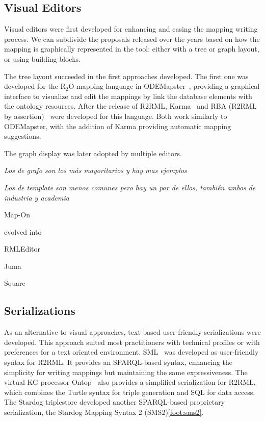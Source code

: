 \subsection{Visual Editors}
\label{sec:chp2_visual-editors}

Visual editors were first developed for enhancing and easing the mapping writing process. We can subdivide the proposals released over the years based on how the mapping is graphically represented in the tool: either with a tree or graph layout, or using building blocks.

The tree layout succeeded in the first approaches developed. 
The first one was developed for the R$_2$O mapping language in ODEMapster~\parencite{barrasa2006odemapster}, providing a graphical interface to visualize and edit the mappings by link the database elements with the ontology resources. 
After the release of R2RML, Karma~\parencite{gupta2012karma} and RBA (R2RML by assertion)~\parencite{neto2013rba} were developed for this language. Both work similarly to ODEMapster, with the addition of Karma providing automatic mapping suggestions. 

The graph display was later adopted by multiple editors. ~\parencite{fu2013tree-vs-graph} 

\textit{Los de grafo son los más mayoritarios y hay mas ejemplos}

\textit{Los de template son menos comunes pero hay un par de ellos, también ambos de industria y academia}

Map-On~\parencite{sicilia2017map}



\cite{sengupta2013editing} evolved into \cite{pinkel2014best}

\cite{lembo2014visualization}

RMLEditor~\parencite{heyvaert2016rmleditor}

Juma~\parencite{crotti2017juma}

Square~\parencite{blinkiewicz2016square}




\subsection{Serializations}
\label{sec:chp2_serializations}

As an alternative to visual approaches, text-based user-friendly serializations were developed. This approach suited most practitioners with technical profiles or with preferences for a text oriented environment. 
SML~\parencite{Stadler2015sml} was developed as user-friendly syntax for R2RML. It provides an SPARQL-based syntax, enhancing the simplicity for writing mappings but maintaining the same expressiveness. 
The virtual KG processor Ontop~\parencite{calvanese2017ontop} also provides a simplified serialization for R2RML, which combines the Turtle syntax for triple generation and SQL for data access. 
The Stardog triplestore developed another SPARQL-based proprietary serialization, the Stardog Mapping Syntax 2 (SMS2)\cref{foot:sms2}. 


